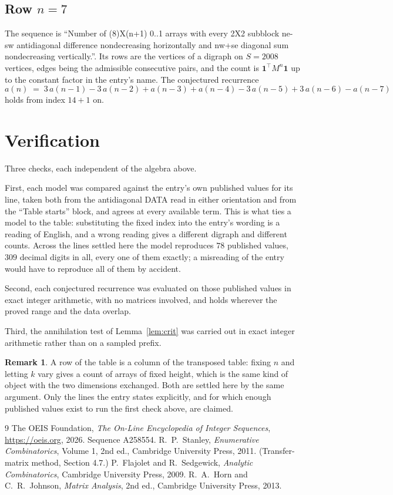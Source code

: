 \documentclass[11pt,a4paper]{article}
\theoremstyle{plain}
\theoremstyle{definition}
\newtheorem{remark}[theorem]{Remark}
\begin{document}
\subsection*{Row $n$$=7$}
The sequence is ``Number of (8)X(n+1) 0..1 arrays with every 2X2 subblock ne-sw antidiagonal difference nondecreasing horizontally and nw+se diagonal sum nondecreasing vertically.''. Its rows are the vertices of a digraph on
$S=2008$ vertices, edges being the admissible consecutive pairs, and the count is
$\mathbf{1}^{\!\top}M^{n}\mathbf{1}$ up to the constant factor in the entry's name.
The conjectured recurrence
\[
a(n)\;=\;3\,a(n-1) - 3\,a(n-2) + a(n-3) + a(n-4) - 3\,a(n-5) + 3\,a(n-6) - a(n-7)
\]
holds from index $14+1$ on.

\section{Verification}

Three checks, each independent of the algebra above.

First, each model was compared against the entry's own published values for its line, taken
both from the antidiagonal DATA read in either orientation and from the ``Table starts''
block, and agrees at every available term. This is what ties a model to the table:
substituting the fixed index into the entry's wording is a reading of English, and a wrong
reading gives a different digraph and different counts. Across the lines settled here the
model reproduces $78$ published values, $309$ decimal digits in all, every one of
them exactly; a misreading of the entry would have to reproduce all of them by accident.

Second, each conjectured recurrence was evaluated on those published values in exact
integer arithmetic, with no matrices involved, and holds wherever the proved range and the
data overlap.

Third, the annihilation test of Lemma~\ref{lem:crit} was carried out in exact integer
arithmetic rather than on a sampled prefix.

\begin{remark}
A row of the table is a column of the transposed table: fixing $n$ and letting $k$ vary gives a
count of arrays of fixed height, which is the same kind of object with the two dimensions
exchanged. Both are settled here by the same argument. Only the lines the entry states
explicitly, and for which enough published values exist to run the first check above, are
claimed.
\end{remark}

\begin{thebibliography}{9}
 The OEIS Foundation, \emph{The On-Line Encyclopedia of Integer
Sequences}, \url{https://oeis.org}, 2026. Sequence A258554.
 R.~P.~Stanley, \emph{Enumerative Combinatorics}, Volume 1, 2nd ed.,
Cambridge University Press, 2011. (Transfer-matrix method, Section 4.7.)
 P.~Flajolet and R.~Sedgewick, \emph{Analytic Combinatorics}, Cambridge
University Press, 2009.
 R.~A.~Horn and C.~R.~Johnson, \emph{Matrix Analysis}, 2nd ed., Cambridge
University Press, 2013.
\end{thebibliography}
\end{document}
